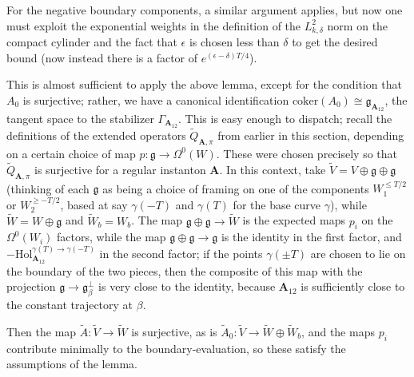 \documentclass{memo-l}
\theoremstyle{definition}
\theoremstyle{remark}
\numberwithin{section}{chapter}
\numberwithin{equation}{chapter}
\begin{document}
For the negative boundary components, a similar argument applies, but now one must exploit the exponential weights in the definition of the $L^2_{k,\delta}$ norm on the compact cylinder and the fact that $\epsilon$ is chosen less than $\delta$ to get the desired bound (now instead there is a factor of $e^{(\epsilon - \delta)T/4}$).

This is almost sufficient to apply the above lemma, except for the condition that $A_0$ is surjective; rather, we have a canonical identification $\text{coker}(A_0) \cong \mathfrak g_{\mathbf{A}_{12}}$, the tangent space to the stabilizer $\Gamma_{\mathbf{A}_{12}}$. This is easy enough to dispatch; recall the definitions of the extended operators $\widetilde{Q}_{\mathbf{A},\pi}$ from earlier in this section, depending on a certain choice of map $p: \mathfrak g \to \Omega^0(W)$. These were chosen precisely so that $\widetilde Q_{\mathbf{A},\pi}$ is surjective for a regular instanton $\mathbf{A}$. In this context, take $\widetilde V = V \oplus \mathfrak g \oplus \mathfrak g$ (thinking of each $\mathfrak g$ as being a choice of framing on one of the components $W_1^{\leq T/2}$ or $W_2^{\geq -T/2}$, based at say $\gamma(-T)$ and $\gamma(T)$ for the base curve $\gamma$), while $\widetilde W = W \oplus \mathfrak g$ and $\widetilde W_b = W_b$. The map $\mathfrak g \oplus \mathfrak g \to \widetilde W$ is the expected maps $p_i$ on the $\Omega^0(W_i)$ factors, while the map $\mathfrak g \oplus \mathfrak g \to \mathfrak g$ is the identity in the first factor, and $-\text{Hol}^{\gamma(T) \to \gamma(-T)}_{\mathbf{A}_{12}}$ in the second factor; if the points $\gamma(\pm T)$ are chosen to lie on the boundary of the two pieces, then the composite of this map with the projection $\mathfrak g \to \mathfrak g_\beta^\perp$ is very close to the identity, because $\mathbf{A}_{12}$ is sufficiently close to the constant trajectory at $\beta$.

Then the map $\widetilde A: \widetilde V \to \widetilde W$ is surjective, as is $\widetilde A_0: \widetilde V \to \widetilde W \oplus \widetilde W_b$, and the maps $p_i$ contribute minimally to the boundary-evaluation, so these satisfy the assumptions of the lemma.
\end{document}
